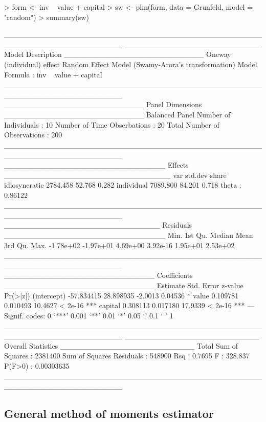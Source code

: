 \documentclass{article}
\begin{document}
\begin{Schunk}
\begin{Sinput}
> form <- inv ~ value + capital
> sw <- plm(form, data = Grunfeld, model = "random")
> summary(sw)
\end{Sinput}
\begin{Soutput}
______________________________________________________________________ 
_________________________ Model Description __________________________
Oneway (individual) effect
Random Effect Model (Swamy-Arora's transformation)
Model Formula            : inv ~ value + capital
______________________________________________________________________ 
__________________________ Panel Dimensions __________________________
Balanced Panel
Number of Individuals        :  10
Number of Time Obserbations  :  20
Total Number of Observations :  200
______________________________________________________________________ 
______________________________ Effects _______________________________
                   var  std.dev share
idiosyncratic 2784.458   52.768 0.282
individual    7089.800   84.201 0.718
theta   :  0.86122  
______________________________________________________________________ 
_____________________________ Residuals ______________________________
     Min.   1st Qu.    Median      Mean   3rd Qu.      Max. 
-1.78e+02 -1.97e+01  4.69e+00  3.92e-16  1.95e+01  2.53e+02 
______________________________________________________________________ 
____________________________ Coefficients ____________________________
              Estimate Std. Error z-value Pr(>|z|)    
(intercept) -57.834415  28.898935 -2.0013  0.04536 *  
value         0.109781   0.010493 10.4627  < 2e-16 ***
capital       0.308113   0.017180 17.9339  < 2e-16 ***
---
Signif. codes:  0 ‘***’ 0.001 ‘**’ 0.01 ‘*’ 0.05 ‘.’ 0.1 ‘ ’ 1 
______________________________________________________________________ 
_________________________ Overall Statistics _________________________
Total Sum of Squares       : 2381400
Sum of Squares Residuals   : 548900
Rsq                        : 0.7695
F                          : 328.837
P(F>0)                     : 0.00303635
______________________________________________________________________ 
\end{Soutput}
\end{Schunk}

\subsection{General method of moments estimator}
\end{document}
